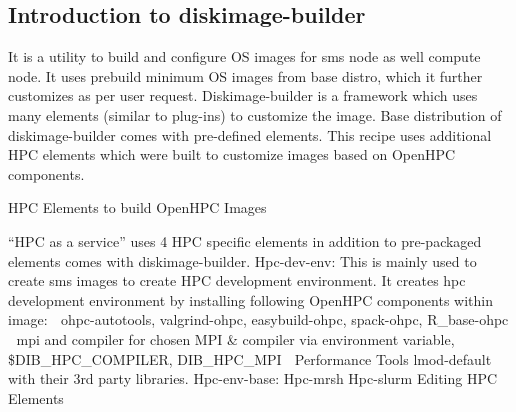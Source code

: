 \begin{section}
{\subsection{Introduction to diskimage-builder}

It is a utility to build and configure OS images for sms node as well compute node. It uses prebuild minimum OS images from base distro, which it further customizes as per user request. Diskimage-builder is a framework which uses many elements (similar to plug-ins) to customize the image. Base distribution of diskimage-builder comes with pre-defined elements. This recipe uses additional HPC elements which were built to customize images based on OpenHPC components.

HPC Elements to build OpenHPC Images

“HPC as a service” uses 4 HPC specific elements in addition to pre-packaged elements comes with diskimage-builder.
Hpc-dev-env: This is mainly used to create sms images to create HPC development environment. It creates hpc development environment by installing following OpenHPC components within image: 
	ohpc-autotools, valgrind-ohpc, easybuild-ohpc, spack-ohpc, R\_base-ohpc
	mpi and compiler for chosen MPI \& compiler via environment variable, \$DIB\_HPC\_COMPILER, DIB\_HPC\_MPI
	Performance Tools lmod-default with their 3rd party libraries.
Hpc-env-base: 
Hpc-mrsh
Hpc-slurm
Editing HPC Elements
}
%
\end{section}
